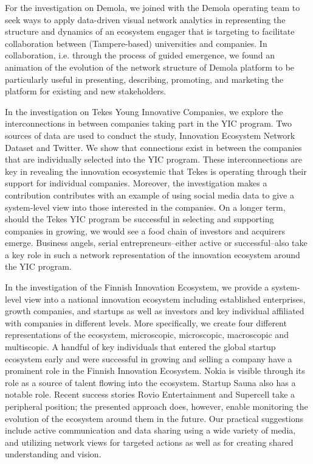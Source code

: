For the investigation on Demola, we joined with the Demola operating team to seek ways to apply data-driven visual network analytics in representing the structure and dynamics of an ecosystem engager that is targeting to facilitate collaboration between (Tampere-based) universities and companies. In collaboration, i.e. through the process of guided emergence, we found an animation of the evolution of the network structure of Demola platform to be particularly useful in presenting, describing, promoting, and marketing the platform for existing and new stakeholders.

In the investigation on Tekes Young Innovative Companies, we explore the interconnections in between companies taking part in the YIC program. Two sources of data are used to conduct the study, Innovation Ecosystem Network Dataset and Twitter. We show that connections exist in between the companies that are individually selected into the YIC program. These interconnections are key in revealing the innovation ecosystemic that Tekes is operating through their support for individual companies.  Moreover, the investigation makes a contribution contributes with an example of using social media data to give a system-level view into those interested in the companies. On a longer term, should the Tekes YIC program be successful in selecting and supporting companies in growing, we would see a food chain of investors and acquirers emerge. Business angels, serial entrepreneurs--either active or successful--also take a key role in such a network representation of the innovation ecosystem around the YIC program. 

In the investigation of the Finnish Innovation Ecosystem, we provide a system-level view into a national innovation ecosystem including established enterprises, growth companies, and startups as well as investors and key individual affiliated with companies in different levels. More specifically, we create four different representations of the ecosystem, microscopic, microscopic, macroscopic and multiscopic. A handful of key individuals that entered the global startup ecosystem early and were successful in growing and selling a company have a prominent role in the Finnish Innovation Ecosystem. Nokia is visible through its role as a source of talent flowing into the ecosystem. Startup Sauna also has a notable role. Recent success stories Rovio Entertainment and Supercell take a peripheral position; the presented approach does, however, enable monitoring the evolution of the ecosystem around them in the future. Our practical suggestions include active communication and data sharing using a wide variety of media, and utilizing network views for targeted actions as well as for creating shared understanding and vision.

